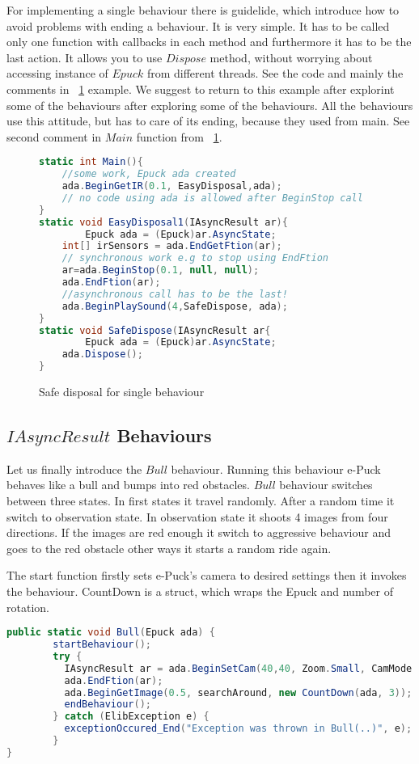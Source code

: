 	For implementing a single behaviour there is guidelide, which introduce how to avoid problems with ending a behaviour.
	It is very simple. It has to be called only one function with callbacks in each method and furthermore it has to be the last action.
	It allows you to use $Dispose$ method, 
	without worrying about accessing instance of $Epuck$  from different threads.
	See the code and mainly the comments in ~\ref{safedis} example. 
	We suggest to return to this example after explorint some of the behaviours after exploring some of the behaviours.
	All the behaviours use this attitude, but has to care of its ending, because they used from main. See second comment in $Main$ function from ~\ref{safedis}.
\begin{figure}[!hbp]	
\begin{lstlisting}[language=cs]
static int Main(){
	//some work, Epuck ada created
	ada.BeginGetIR(0.1, EasyDisposal,ada);
	// no code using ada is allowed after BeginStop call
}
static void EasyDisposal1(IAsyncResult ar){
        Epuck ada = (Epuck)ar.AsyncState;
	int[] irSensors = ada.EndGetFtion(ar);
	// synchronous work e.g to stop using EndFtion
	ar=ada.BeginStop(0.1, null, null);
	ada.EndFtion(ar);
	//asynchronous call has to be the last!
	ada.BeginPlaySound(4,SafeDispose, ada);
}
static void SafeDispose(IAsyncResult ar{
        Epuck ada = (Epuck)ar.AsyncState;
	ada.Dispose();
}
\end{lstlisting}
\caption{Safe disposal for single behaviour} \label{safedis}
\end{figure}

\subsection{$IAsyncResult$ Behaviours}\label{sec:iabehaviors}
	Let us finally introduce the $Bull$ behaviour.
	Running this behaviour e-Puck behaves like a bull and bumps into red obstacles.
	$Bull$ behaviour switches between three states. In first states it travel randomly. After a random time it switch to observation state.
	In observation state it shoots 4 images from four directions. If the images are red enough it switch to aggressive behaviour and goes to the red obstacle
	other ways it starts a random ride again.

	
	The start function firstly sets e-Puck's camera to desired settings then it invokes the behaviour.
	CountDown is a struct, which wraps the Epuck and number of rotation.

\begin{lstlisting}[language=cs]
public static void Bull(Epuck ada) {
        startBehaviour();
        try {
          IAsyncResult ar = ada.BeginSetCam(40,40, Zoom.Small, CamMode.Color, toSetCam, null, null);
          ada.EndFtion(ar);
          ada.BeginGetImage(0.5, searchAround, new CountDown(ada, 3));
          endBehaviour();
        } catch (ElibException e) {
          exceptionOccured_End("Exception was thrown in Bull(..)", e);
        }
}
\end{lstlisting}
	
